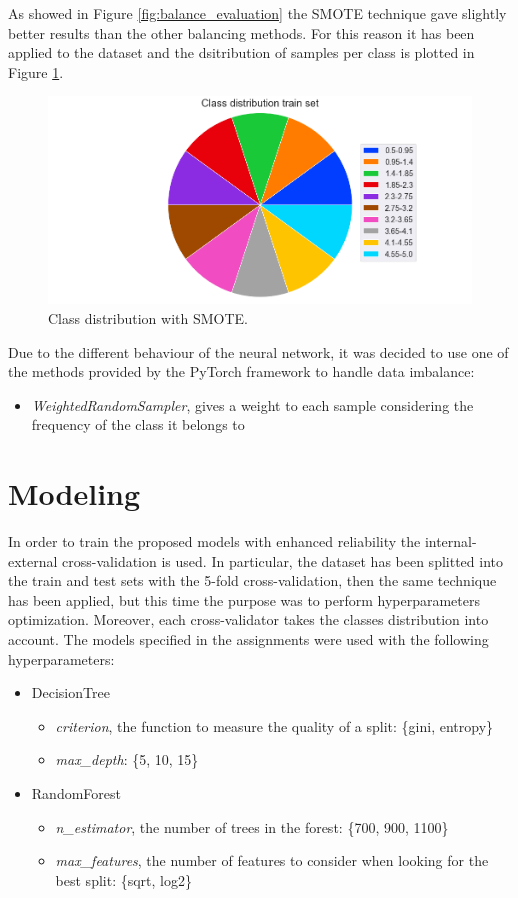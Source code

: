 \documentclass[../main]{subfiles}
\begin{document}
As showed in Figure \ref{fig:balance_evaluation} the SMOTE technique gave slightly better results than the other balancing methods.
For this reason it has been applied to the dataset and the dsitribution of samples per class is plotted in Figure \ref{fig:class_distribuition_balance}.
\begin{figure}[h]
    \center
    \includegraphics[width=0.6\linewidth]{figures/class_distribution_smote.png}
    \caption{Class distribution  with SMOTE.}
    \label{fig:class_distribuition_balance}
\end{figure}

Due to the different behaviour of the neural network, it was decided to use one of the methods provided by the PyTorch framework to handle data imbalance:
\begin{itemize}
    \item \textit{WeightedRandomSampler}, gives a weight to each sample considering the frequency of the class it belongs to
\end{itemize}

\section{Modeling}
In order to train the proposed models with enhanced reliability the internal-external cross-validation is used.
In particular, the dataset has been splitted into the train and test sets with the 5-fold cross-validation, then the same technique has been applied, but this time the purpose was to perform hyperparameters optimization.
Moreover, each cross-validator takes the classes distribution into account.
The models specified in the assignments were used with the following hyperparameters:
\begin{itemize}
    \item DecisionTree
    \begin{itemize}
        \item \textit{criterion}, the function to measure the quality of a split: \{gini, entropy\}
        \item \textit{max\_depth}: \{5, 10, 15\}
    \end{itemize}
    \item RandomForest
    \begin{itemize}
        \item \textit{n\_estimator}, the number of trees in the forest: \{700, 900, 1100\}
        \item \textit{max\_features}, the number of features to consider when looking for the best split: \{sqrt, log2\}
    \end{itemize} 
\end{itemize}
\end{document}
